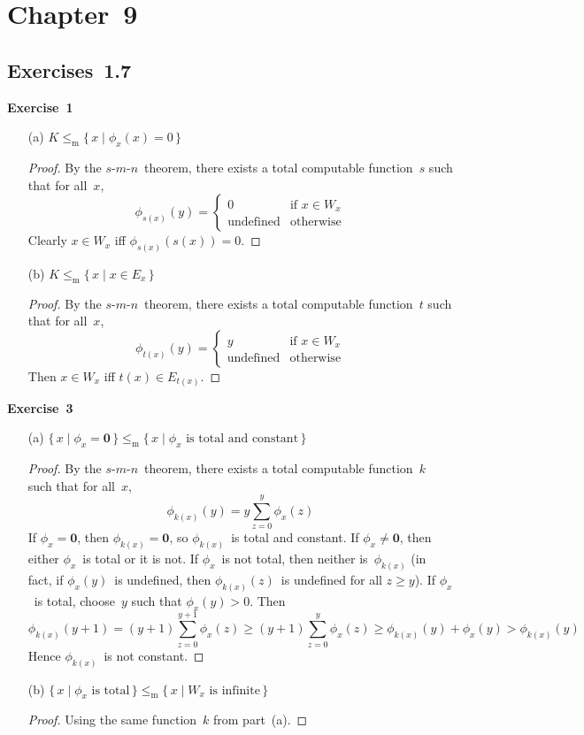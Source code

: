 \documentclass[letterpaper]{article}
\newcommand{\exercise}[2][]{\noindent\textbf{Exercise~{#2}}\ifthenelse{\isempty{#1}}{\textbf{.}}{ ({#1})\textbf{.}}}
\newcommand{\mr}{\mathrel{\le_{\mathrm{m}}}}
\newcommand{\smn}{$s$-$m$-$n$}
\theoremstyle{plain}
\theoremstyle{definition}
\theoremstyle{remark}
\begin{document}
\section*{Chapter~9}
\subsection*{Exercises~1.7}
\exercise{1}
\begin{enumerate}[itemsep=0pt]
\item[(a)] $K\mr\{\,x\mid\phi_x(x)=0\,\}$
\begin{proof}
By the \smn\ theorem, there exists a total computable function~$s$ such that for all~$x$,
$$\phi_{s(x)}(y)=\begin{cases}
0&\text{if }x\in W_x\\
\text{undefined}&\text{otherwise}
\end{cases}$$
Clearly $x\in W_x$ iff $\phi_{s(x)}(s(x))=0$.
\end{proof}
\item[(b)] $K\mr\{\,x\mid x\in E_x\,\}$
\begin{proof}
By the \smn\ theorem, there exists a total computable function~$t$ such that for all~$x$,
$$\phi_{t(x)}(y)=\begin{cases}
y&\text{if }x\in W_x\\
\text{undefined}&\text{otherwise}
\end{cases}$$
Then $x\in W_x$ iff $t(x)\in E_{t(x)}$.
\end{proof}
\end{enumerate}

\exercise{3}
\begin{enumerate}[itemsep=0pt]
\item[(a)] $\{\,x\mid \phi_x=\mathbf{0}\,\}\mr\{\,x\mid\phi_x\text{ is total and constant}\,\}$
\begin{proof}
By the \smn\ theorem, there exists a total computable function~$k$ such that for all~$x$,
$$\phi_{k(x)}(y)=y\sum_{z=0}^y\phi_x(z)$$
If $\phi_x=\mathbf{0}$, then $\phi_{k(x)}=\mathbf{0}$, so $\phi_{k(x)}$~is total and constant. If $\phi_x\ne\mathbf{0}$, then either $\phi_x$~is total or it is not. If $\phi_x$~is not total, then neither is~$\phi_{k(x)}$ (in fact, if $\phi_x(y)$~is undefined, then $\phi_{k(x)}(z)$~is undefined for all $z\ge y$). If $\phi_x$~is total, choose~$y$ such that $\phi_x(y)>0$. Then
$$\phi_{k(x)}(y+1)=(y+1)\sum_{z=0}^{y+1}\phi_x(z)\ge(y+1)\sum_{z=0}^y\phi_x(z)\ge\phi_{k(x)}(y)+\phi_x(y)>\phi_{k(x)}(y)$$
Hence $\phi_{k(x)}$~is not constant.
\end{proof}
\item[(b)] $\{\,x\mid\phi_x\text{ is total}\,\}\mr\{\,x\mid W_x\text{ is infinite}\,\}$
\begin{proof}
Using the same function~$k$ from part~(a).
\end{proof}
\end{enumerate}
\end{document}
